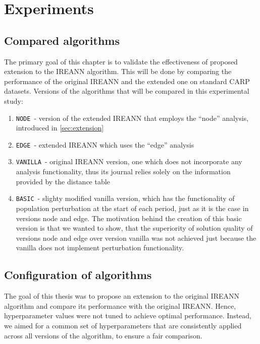 \documentclass[twoside]{ctuthesis}
\theoremstyle{plain}
\theoremstyle{definition}
\theoremstyle{note}
\begin{document}
\newcommand{\nnsrvanilla} {\texttt{VANILLA}}
\newcommand{\nnsrbasic} {\texttt{BASIC}}
\newcommand{\nnsrnode} {\texttt{NODE}}
\newcommand{\nnsredge} {\texttt{EDGE}}



\chapter{Experiments}
\label{sec:experiments}

\section{Compared algorithms}
The primary goal of this chapter is to validate the effectiveness of proposed extension to the IREANN algorithm. This will be done by comparing the performance of the original IREANN and the extended one on standard CARP datasets. 
Versions of the algorithms that will be compared in this experimental study:
\begin{enumerate}
	\item \nnsrnode\  - version of the extended IREANN that employs the ``node'' analysis, introduced in \ref{sec:extension}
	\item \nnsredge\ - extended IREANN which uses the ``edge'' analysis
	\item \nnsrvanilla\ - original IREANN version, one which does not incorporate any analysis functionality, thus its journal relies solely on the information provided by the distance table
	\item \nnsrbasic\  - slighty modified vanilla version, which has the functionality of population perturbation at the start of each period, just as it is the case in versions node and edge. The motivation behind the creation of this basic version is that we wanted to show, that the superiority of solution quality of versions node and edge over version vanilla was not achieved just because the vanilla does not implement perturbation functionality.
\end{enumerate}

\section{Configuration of algorithms}

The goal of this thesis was to propose an extension to the original IREANN algorithm and compare its performance with the original IREANN. Hence, hyperparameter values were not tuned to achieve optimal performance. Instead, we aimed for a common set of hyperparameters that are consistently applied across all versions of the algorithm, to ensure a fair comparison. 
\end{document}
